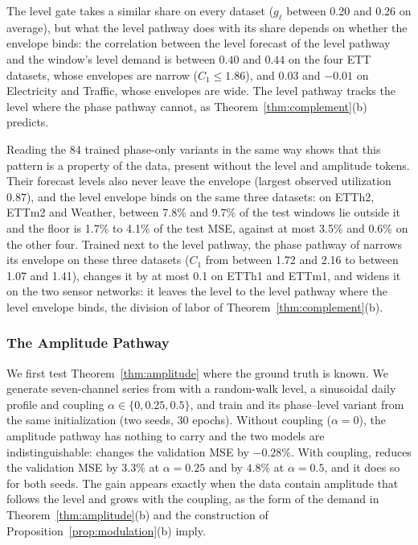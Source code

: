 { The level gate takes a similar share on every dataset ($g_\ell$ between 0.20 and 0.26 on average), but what the level pathway does with its share depends on whether the envelope binds: the correlation between the level forecast of the level pathway and the window's level demand is between $0.40$ and $0.44$ on the four ETT datasets, whose envelopes are narrow ($C_1\le1.86$), and $0.03$ and $-0.01$ on Electricity and Traffic, whose envelopes are wide. The level pathway tracks the level where the phase pathway cannot, as Theorem~\ref{thm:complement}(b) predicts.

Reading the 84 trained phase-only variants in the same way shows that this pattern is a property of the data, present without the level and amplitude tokens. Their forecast levels also never leave the envelope (largest observed utilization $0.87$), and the level envelope binds on the same three datasets: on ETTh2, ETTm2 and Weather, between 7.8\% and 9.7\% of the test windows lie outside it and the floor is 1.7\% to 4.1\% of the test MSE, against at most 3.5\% and 0.6\% on the other four. Trained next to the level pathway, the phase pathway of \sysplus narrows its envelope on these three datasets ($C_1$ from between 1.72 and 2.16 to between 1.07 and 1.41), changes it by at most 0.1 on ETTh1 and ETTm1, and widens it on the two sensor networks: it leaves the level to the level pathway where the level envelope binds, the division of labor of Theorem~\ref{thm:complement}(b).

\subsubsection{The Amplitude Pathway}
\label{sec:exp_mechanism}

We first test Theorem~\ref{thm:amplitude} where the ground truth is known. We generate seven-channel series from  with a random-walk level, a sinusoidal daily profile and coupling $\alpha\in\{0,0.25,0.5\}$, and train \sysplus and its phase--level variant from the same initialization (two seeds, 30 epochs). Without coupling ($\alpha=0$), the amplitude pathway has nothing to carry and the two models are indistinguishable: \sysplus changes the validation MSE by $-0.28\%$. With coupling, \sysplus reduces the validation MSE by $3.3\%$ at $\alpha=0.25$ and by $4.8\%$ at $\alpha=0.5$, and it does so for both seeds. The gain appears exactly when the data contain amplitude that follows the level and grows with the coupling, as the form of the demand in Theorem~\ref{thm:amplitude}(b) and the construction of Proposition~\ref{prop:modulation}(b) imply.

}

